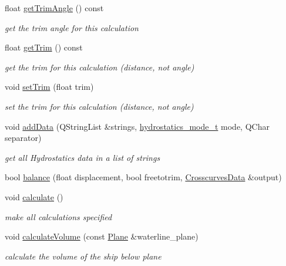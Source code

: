\begin{DoxyCompactItemize}
\item 
float \hyperlink{classShipCAD_1_1HydrostaticCalc_aecd19708f7ebadb4321af93565ffc184}{get\+Trim\+Angle} () const 
\begin{DoxyCompactList}\small\item\em get the trim angle for this calculation \end{DoxyCompactList}\item 
float \hyperlink{classShipCAD_1_1HydrostaticCalc_a90ae18aaf3a9836d01594cda165f35bb}{get\+Trim} () const 
\begin{DoxyCompactList}\small\item\em get the trim for this calculation (distance, not angle) \end{DoxyCompactList}\item 
void \hyperlink{classShipCAD_1_1HydrostaticCalc_ace579596fa77d8e3ea4f854ca033ed83}{set\+Trim} (float trim)
\begin{DoxyCompactList}\small\item\em set the trim for this calculation (distance, not angle) \end{DoxyCompactList}\item 
void \hyperlink{classShipCAD_1_1HydrostaticCalc_a919bce0b984cbef1c59534d6e9fec46f}{add\+Data} (Q\+String\+List \&strings, \hyperlink{namespaceShipCAD_a2c84d37615dd30be37ed0253501fb9a3}{hydrostatics\+\_\+mode\+\_\+t} mode, Q\+Char separator)
\begin{DoxyCompactList}\small\item\em get all Hydrostatics data in a list of strings \end{DoxyCompactList}\item 
bool \hyperlink{classShipCAD_1_1HydrostaticCalc_a7573a510a6b53e56a79f4042e41ee89e}{balance} (float displacement, bool freetotrim, \hyperlink{structShipCAD_1_1CrosscurvesData}{Crosscurves\+Data} \&output)
\item 
void \hyperlink{classShipCAD_1_1HydrostaticCalc_ab0c8f5dc5c576e6e9eae5fb27fd5bdd0}{calculate} ()
\begin{DoxyCompactList}\small\item\em make all calculations specified \end{DoxyCompactList}\item 
void \hyperlink{classShipCAD_1_1HydrostaticCalc_ad37fd32bf358c96b6653c6c92fd92c20}{calculate\+Volume} (const \hyperlink{classShipCAD_1_1Plane}{Plane} \&waterline\+\_\+plane)
\begin{DoxyCompactList}\small\item\em calculate the volume of the ship below plane \end{DoxyCompactList}\end{DoxyCompactItemize}
